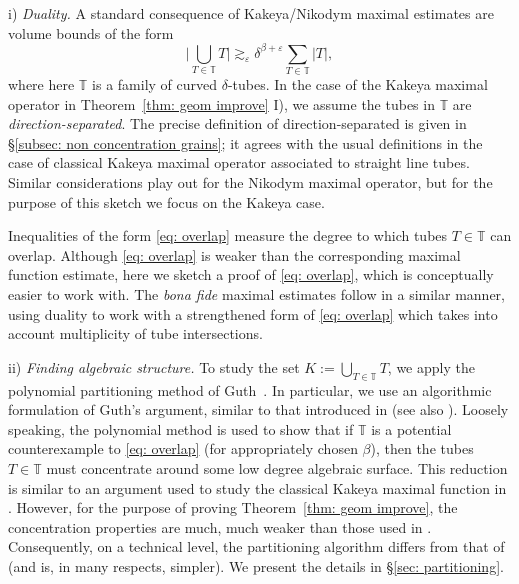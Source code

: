 \documentclass[reqno]{amsart}
\numberwithin{equation}{section}
\newcommand{\T}{\mathbb{T}}
\theoremstyle{plain}
\theoremstyle{definition}
\begin{document}
\noindent i) \textit{Duality.} A standard consequence of Kakeya/Nikodym maximal estimates are volume bounds of the form
    \begin{equation}\label{eq: overlap}
        \Big|\bigcup_{T \in \T} T \Big| \gtrsim_{\varepsilon} \delta^{\beta + \varepsilon} \sum_{T \in \T} |T|,
    \end{equation}
    where here $\T$ is a family of curved $\delta$-tubes. In the case of the Kakeya maximal operator in Theorem~\ref{thm: geom improve} I), we assume the tubes in $\T$ are \textit{direction-separated}. The precise definition of direction-separated is given in \S\ref{subsec: non concentration grains}; it agrees with the usual definitions in the case of classical Kakeya maximal operator associated to straight line tubes. Similar considerations play out for the Nikodym maximal operator, but for the purpose of this sketch we focus on the Kakeya case.
    
    Inequalities of the form \eqref{eq: overlap} measure the degree to which tubes $T \in \T$ can overlap. Although \eqref{eq: overlap} is weaker than the corresponding maximal function estimate, here we sketch a proof of \eqref{eq: overlap}, which is conceptually easier to work with. The \textit{bona fide} maximal estimates follow in a similar manner, using duality to work with a strengthened form of \eqref{eq: overlap} which takes into account multiplicity of tube intersections.\medskip
  
\noindent ii) \textit{Finding algebraic structure.} To study the set $K := \bigcup_{T \in \T} T$, we apply the polynomial partitioning method of Guth~\cite{Guth2016, Guth2018}. In particular, we use an algorithmic formulation of Guth's argument, similar to that introduced in \cite{HRZ2022} (see also \cite{Zahl2021}). Loosely speaking, the polynomial method is used to show that if $\T$ is a potential counterexample to \eqref{eq: overlap} (for appropriately chosen $\beta$), then the tubes $T \in \T$ must concentrate around some low degree algebraic surface. This reduction is similar to an argument used to study the classical Kakeya maximal function in \cite{HRZ2022}. However, for the purpose of proving Theorem~\ref{thm: geom improve}, the concentration properties are much, much weaker than those used in \cite{HRZ2022}. Consequently, on a technical level, the partitioning algorithm differs from that of \cite{HRZ2022} (and is, in many respects, simpler). We present the details in \S\ref{sec: partitioning}. \medskip
    
\end{document}

